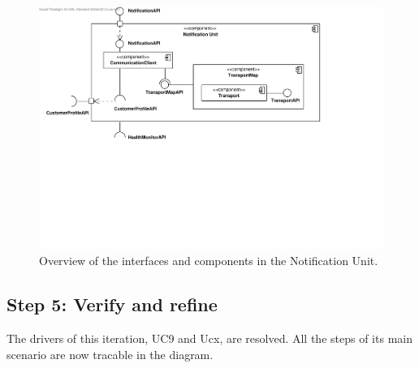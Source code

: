 \begin{figure}[H]
	\begin{centering}
		\includegraphics[width=\textwidth]{figs/add-it8-interfaces.pdf}
		\caption{Overview of the interfaces and components in the Notification Unit.}
		\label{fig:it8/interfaces}
	\end{centering}
\end{figure}

\subsection{Step 5: Verify and refine}
\label{add:it8/verification}

\npar The drivers of this iteration, UC9 and Ucx, are resolved. All the steps of
its main scenario are now tracable in the diagram.
